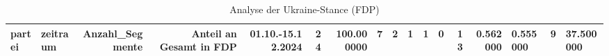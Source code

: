 \begin{table}
\caption{Analyse der Ukraine-Stance (FDP)}
\label{tab:meine_tabelle}
\begin{tabular}{llrrrrrrrrrrrr}
\toprule
partei & zeitraum & Anzahl_Segmente & Anteil an Gesamt in %
\midrule
FDP & 01.10.-15.12.2024 & 24 & 100.000000 & 7 & 2 & 1 & 1 & 0 & 13 & 0.562000 & 0.555000 & 9 & 37.500000 \\
\bottomrule
\end{tabular}
\end{table}
